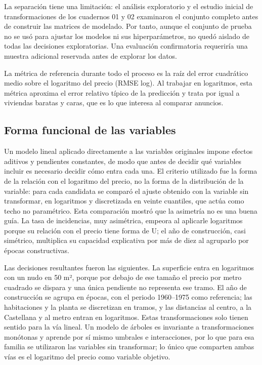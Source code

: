 \documentclass[11pt,a4paper]{article}
\begin{document}
La separación tiene una limitación: el análisis exploratorio y el estudio inicial de transformaciones de los cuadernos 01 y 02 examinaron el conjunto completo antes de construir las matrices de modelado. Por tanto, aunque el conjunto de prueba no se usó para ajustar los modelos ni sus hiperparámetros, no quedó aislado de todas las decisiones exploratorias. Una evaluación confirmatoria requeriría una muestra adicional reservada antes de explorar los datos.

La métrica de referencia durante todo el proceso es la raíz del error cuadrático medio sobre el logaritmo del precio (RMSE log). Al trabajar en logaritmos, esta métrica aproxima el error relativo típico de la predicción y trata por igual a viviendas baratas y caras, que es lo que interesa al comparar anuncios.

\subsection{Forma funcional de las variables}

Un modelo lineal aplicado directamente a las variables originales impone efectos aditivos y pendientes constantes, de modo que antes de decidir qué variables incluir es necesario decidir cómo entra cada una. El criterio utilizado fue la forma de la relación con el logaritmo del precio, no la forma de la distribución de la variable: para cada candidata se comparó el ajuste obtenido con la variable sin transformar, en logaritmos y discretizada en veinte cuantiles, que actúa como techo no paramétrico. Esta comparación mostró que la asimetría no es una buena guía. La tasa de incidencias, muy asimétrica, empeora al aplicarle logaritmos porque su relación con el precio tiene forma de U; el año de construcción, casi simétrico, multiplica su capacidad explicativa por más de diez al agruparlo por épocas constructivas.

Las decisiones resultantes fueron las siguientes. La superficie entra en logaritmos con un nudo en 50 m², porque por debajo de ese tamaño el precio por metro cuadrado se dispara y una única pendiente no representa ese tramo. El año de construcción se agrupa en épocas, con el periodo 1960--1975 como referencia; las habitaciones y la planta se discretizan en tramos, y las distancias al centro, a la Castellana y al metro entran en logaritmos. Estas transformaciones solo tienen sentido para la vía lineal. Un modelo de árboles es invariante a transformaciones monótonas y aprende por sí mismo umbrales e interacciones, por lo que para esa familia se utilizaron las variables sin transformar; lo único que comparten ambas vías es el logaritmo del precio como variable objetivo.
\end{document}
